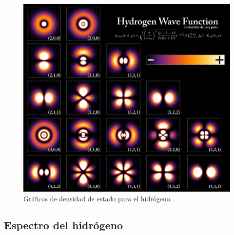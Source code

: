 \documentclass[12pt]{beamer}
\begin{document}
\begin{frame}[plain]
\begin{figure}[H]
    \centering
    \includegraphics[scale=0.1]{Imagenes/Hydrogen_Density_Plots.png}
    \caption{Gráficas de densidad de estado para el hidrógeno.}
\end{figure}
\end{frame}

\subsection{Espectro del hidrógeno}
\end{document}
